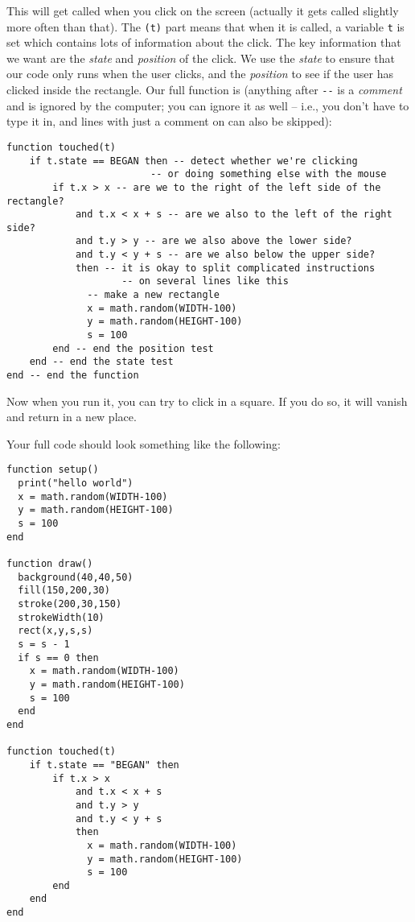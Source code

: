 \documentclass[
  xhtml,%
  use filename%
]{internet}
\begin{document}
This will get called when you click on the screen (actually it gets called slightly more often than that).
The \verb+(t)+ part means that when it is called, a variable \verb+t+ is set which contains lots of information about the click.
The key information that we want are the \emph{state} and \emph{position} of the click.
We use the \emph{state} to ensure that our code only runs when the user clicks, and the \emph{position} to see if the user has clicked inside the rectangle.
Our full function is (anything after \verb+--+ is a \emph{comment} and is ignored by the computer; you can ignore it as well -- i.e., you don't have to type it in, and lines with just a comment on can also be skipped):

\begin{verbatim}
function touched(t)
    if t.state == BEGAN then -- detect whether we're clicking
                         -- or doing something else with the mouse
        if t.x > x -- are we to the right of the left side of the rectangle?
            and t.x < x + s -- are we also to the left of the right side?
            and t.y > y -- are we also above the lower side?
            and t.y < y + s -- are we also below the upper side?
            then -- it is okay to split complicated instructions
                    -- on several lines like this
              -- make a new rectangle
              x = math.random(WIDTH-100)
              y = math.random(HEIGHT-100)
              s = 100
        end -- end the position test
    end -- end the state test
end -- end the function
\end{verbatim}

Now when you run it, you can try to click in a square.
If you do so, it will vanish and return in a new place.

Your full code should look something like the following:

\begin{verbatim}
function setup()
  print("hello world")
  x = math.random(WIDTH-100)
  y = math.random(HEIGHT-100)
  s = 100
end

function draw()
  background(40,40,50)
  fill(150,200,30)
  stroke(200,30,150)
  strokeWidth(10)
  rect(x,y,s,s)
  s = s - 1
  if s == 0 then
    x = math.random(WIDTH-100)
    y = math.random(HEIGHT-100)
    s = 100
  end
end

function touched(t)
    if t.state == "BEGAN" then
        if t.x > x
            and t.x < x + s
            and t.y > y
            and t.y < y + s
            then
              x = math.random(WIDTH-100)
              y = math.random(HEIGHT-100)
              s = 100
        end
    end
end
\end{verbatim}
\end{document}

